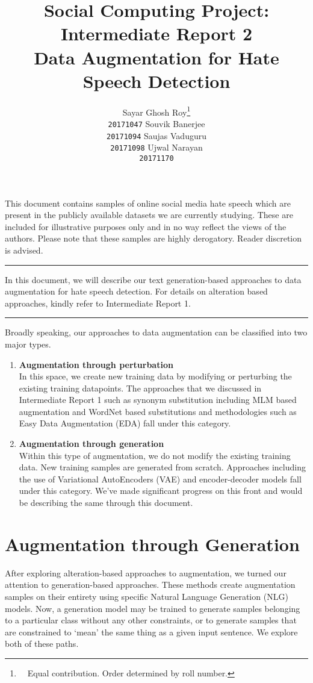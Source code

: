 \documentclass[11pt,a4paper]{article}
\title{{\normalsize Social Computing Project: Intermediate Report 2} \vspace{0.18cm} \\ Data Augmentation for Hate Speech Detection}
\author{Sayar Ghosh Roy\thanks{\ \ Equal contribution. Order determined by roll number.} \\ \texttt{20171047} \And
        Souvik Banerjee\footnotemark[1] \\ \texttt{20171094} \And
        Saujas Vaduguru\footnotemark[1] \\ \texttt{20171098} \And
        Ujwal Narayan\footnotemark[1] \\ \texttt{20171170}}
\date{}
\newcommand\Warning{%
 \makebox[1.4em][c]{%
 \makebox[0pt][c]{\raisebox{.1em}{\small!}}%
 \makebox[0pt][c]{\Large$\bigtriangleup$}}}%
\begin{document}
\maketitle

\Warning This document contains samples of online social media hate speech which are present in the publicly available datasets we are currently studying. These are included for illustrative purposes only and in no way reflect the views of the authors. Please note that these samples are highly derogatory. Reader discretion is advised.

\vspace{4mm}
\hrule
\vspace{4mm}

In this document, we will describe our text generation-based approaches to data augmentation for hate speech detection. For details on alteration based approaches, kindly refer to Intermediate Report 1.\\

\hrule
\vspace{4mm}

Broadly speaking, our approaches to data augmentation can be classified into two major types.
\begin{enumerate}
    \item \textbf{Augmentation through perturbation \vspace{1mm}} \\ 
    In this space, we create new training data by modifying or perturbing the existing training datapoints. The approaches that we discussed in Intermediate Report 1 such as synonym substitution including MLM based augmentation and WordNet based substitutions and methodologies such as Easy Data Augmentation (EDA) \cite{wei-zou-2019-eda} fall under this category. 
    \item \textbf{Augmentation through generation \vspace{1mm}} \\
    Within this type of augmentation, we do not modify the existing training data. New training samples are generated from scratch. Approaches including the use of Variational AutoEncoders (VAE) and encoder-decoder models fall under this category. We've made significant progress on this front and would be describing the same through this document. 
\end{enumerate}

\section*{Augmentation through Generation}
After exploring alteration-based approaches to augmentation, we turned our attention to generation-based approaches. These methods create augmentation samples on their entirety using specific Natural Language Generation (NLG) models. Now, a generation model may be trained to generate samples belonging to a particular class without any other constraints, or to generate samples that are constrained to `mean' the same thing as a given input sentence. We explore both of these paths.
\end{document}
